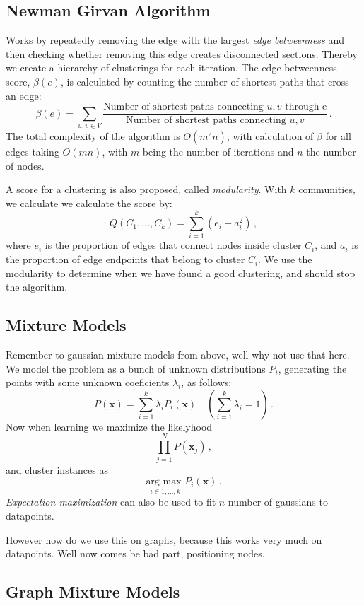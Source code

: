 \subsection{Newman Girvan Algorithm}

Works by repeatedly removing the edge with the largest \emph{edge betweenness} and then checking whether removing this edge creates disconnected sections.
Thereby we create a hierarchy of clusterings for each iteration.
The edge betweenness score, $\beta(e)$, is calculated by counting the number of shortest paths that cross an edge:
\[
    \beta(e) = \sum_{u,v \in V} \frac {\text{Number of shortest paths connecting $u, v$ through e}} {\text{Number of shortest paths connecting $u, v$}}\,.
\]
The total complexity of the algorithm is $O(m^2 n)$, with calculation of $\beta$ for all edges taking $O(mn)$, with $m$ being the number of iterations and $n$ the number of nodes.

A score for a clustering is also proposed, called \emph{modularity}.
With $k$ communities, we calculate we calculate the score by:
\[
    Q(C_1, \dots, C_k) = \sum_{i=1}^k (e_i - a_i^2)\,,
\]
where $e_i$ is the proportion of edges that connect nodes inside cluster $C_i$, and $a_i$ is the proportion of edge endpoints that belong to cluster $C_i$.
We use the modularity to determine when we have found a good clustering, and should stop the algorithm.

\subsection{Mixture Models}

Remember to gaussian mixture models from above, well why not use that here.
We model the problem as a bunch of unknown distributions $P_i$, generating the points with some unknown coeficients $\lambda_i$, as follows:
\[
    P(\mathbf{x}) = \sum_{i=1}^k \lambda_i P_i(\mathbf{x}) \quad \left(\sum_{i=1}^k \lambda_i = 1\right)\,.
\]
Now when learning we maximize the likelyhood
\[
    \prod_{j=1}^N P(\mathbf{x}_j)\,,
\]
and cluster instances as
\[
    \underset{i \in 1,\dots, k}{\text{arg max }} P_i(\mathbf{x})\,.
\]
\emph{Expectation maximization} can also be used to fit $n$ number of gaussians to datapoints.

However how do we use this on graphs, because this works very much on datapoints.
Well now comes be bad part, positioning nodes.

\subsection{Graph Mixture Models}

